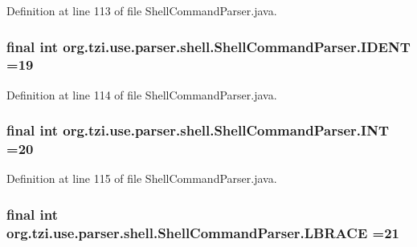 Definition at line 113 of file Shell\-Command\-Parser.\-java.

\hypertarget{classorg_1_1tzi_1_1use_1_1parser_1_1shell_1_1_shell_command_parser_a1bafdcbce11d1457c4e1d3418e757af7}{
\subsubsection[{I\-D\-E\-N\-T}]{\setlength{\rightskip}{0pt plus 5cm}final int org.\-tzi.\-use.\-parser.\-shell.\-Shell\-Command\-Parser.\-I\-D\-E\-N\-T =19\hspace{0.3cm}{\ttfamily [static]}}}\label{classorg_1_1tzi_1_1use_1_1parser_1_1shell_1_1_shell_command_parser_a1bafdcbce11d1457c4e1d3418e757af7}


Definition at line 114 of file Shell\-Command\-Parser.\-java.

\hypertarget{classorg_1_1tzi_1_1use_1_1parser_1_1shell_1_1_shell_command_parser_a1c059ae6c79c68e13522359f3723f86c}{
\subsubsection[{I\-N\-T}]{\setlength{\rightskip}{0pt plus 5cm}final int org.\-tzi.\-use.\-parser.\-shell.\-Shell\-Command\-Parser.\-I\-N\-T =20\hspace{0.3cm}{\ttfamily [static]}}}\label{classorg_1_1tzi_1_1use_1_1parser_1_1shell_1_1_shell_command_parser_a1c059ae6c79c68e13522359f3723f86c}


Definition at line 115 of file Shell\-Command\-Parser.\-java.

\hypertarget{classorg_1_1tzi_1_1use_1_1parser_1_1shell_1_1_shell_command_parser_ad65fe24eaa32d3f810110650aee47824}{
\subsubsection[{L\-B\-R\-A\-C\-E}]{\setlength{\rightskip}{0pt plus 5cm}final int org.\-tzi.\-use.\-parser.\-shell.\-Shell\-Command\-Parser.\-L\-B\-R\-A\-C\-E =21\hspace{0.3cm}{\ttfamily [static]}}}\label{classorg_1_1tzi_1_1use_1_1parser_1_1shell_1_1_shell_command_parser_ad65fe24eaa32d3f810110650aee47824}


